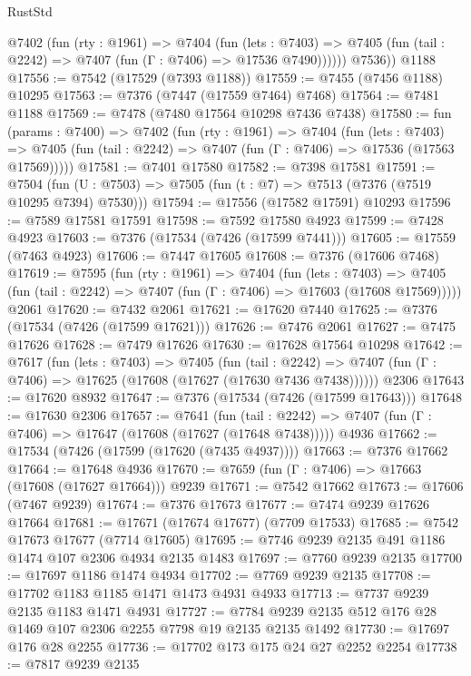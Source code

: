 \begin{lexlean}{RustStd}
\begin{coremodule}
          @7402
            (fun (rty : @1961) =>
            @7404
              (fun (lets : @7403) =>
              @7405 (fun (tail : @2242) => @7407 (fun (Γ : @7406) => @17536 @7490))))))
        @7536))
    @1188
@17556 := @7542 (@17529 (@7393 @1188))
@17559 := @7455 (@7456 @1188) @10295
@17563 := @7376 (@7447 (@17559 @7464) @7468)
@17564 := @7481 @1188
@17569 := @7478 (@7480 @17564 @10298 @7436 @7438)
@17580 := fun (params : @7400) =>
  @7402
    (fun (rty : @1961) =>
    @7404
      (fun (lets : @7403) =>
      @7405 (fun (tail : @2242) => @7407 (fun (Γ : @7406) => @17536 (@17563 @17569)))))
@17581 := @7401 @17580
@17582 := @7398 @17581
@17591 := @7504
    (fun (U : @7503) => @7505 (fun (t : @7) => @7513 (@7376 (@7519 @10295 @7394) @7530)))
@17594 := @17556 (@17582 @17591) @10293
@17596 := @7589 @17581 @17591
@17598 := @7592 @17580 @4923
@17599 := @7428 @4923
@17603 := @7376 (@17534 (@7426 (@17599 @7441)))
@17605 := @17559 (@7463 @4923)
@17606 := @7447 @17605
@17608 := @7376 (@17606 @7468)
@17619 := @7595
    (fun (rty : @1961) =>
    @7404
      (fun (lets : @7403) =>
      @7405 (fun (tail : @2242) => @7407 (fun (Γ : @7406) => @17603 (@17608 @17569)))))
    @2061
@17620 := @7432 @2061
@17621 := @17620 @7440
@17625 := @7376 (@17534 (@7426 (@17599 @17621)))
@17626 := @7476 @2061
@17627 := @7475 @17626
@17628 := @7479 @17626
@17630 := @17628 @17564 @10298
@17642 := @7617
    (fun (lets : @7403) =>
    @7405
      (fun (tail : @2242) =>
      @7407 (fun (Γ : @7406) => @17625 (@17608 (@17627 (@17630 @7436 @7438))))))
    @2306
@17643 := @17620 @8932
@17647 := @7376 (@17534 (@7426 (@17599 @17643)))
@17648 := @17630 @2306
@17657 := @7641
    (fun (tail : @2242) => @7407 (fun (Γ : @7406) => @17647 (@17608 (@17627 (@17648 @7438)))))
    @4936
@17662 := @17534 (@7426 (@17599 (@17620 (@7435 @4937))))
@17663 := @7376 @17662
@17664 := @17648 @4936
@17670 := @7659 (fun (Γ : @7406) => @17663 (@17608 (@17627 @17664))) @9239
@17671 := @7542 @17662
@17673 := @17606 (@7467 @9239)
@17674 := @7376 @17673
@17677 := @7474 @9239 @17626 @17664
@17681 := @17671 (@17674 @17677) (@7709 @17533)
@17685 := @7542 @17673 @17677 (@7714 @17605)
@17695 := @7746 @9239 @2135 @491 @1186 @1474 @107 @2306 @4934 @2135 @1483
@17697 := @7760 @9239 @2135
@17700 := @17697 @1186 @1474 @4934
@17702 := @7769 @9239 @2135
@17708 := @17702 @1183 @1185 @1471 @1473 @4931 @4933
@17713 := @7737 @9239 @2135 @1183 @1471 @4931
@17727 := @7784 @9239 @2135 @512 @176 @28 @1469 @107 @2306 @2255 @7798 @19 @2135 @2135 @1492
@17730 := @17697 @176 @28 @2255
@17736 := @17702 @173 @175 @24 @27 @2252 @2254
@17738 := @7817 @9239 @2135

\end{coremodule}
\end{lexlean}
